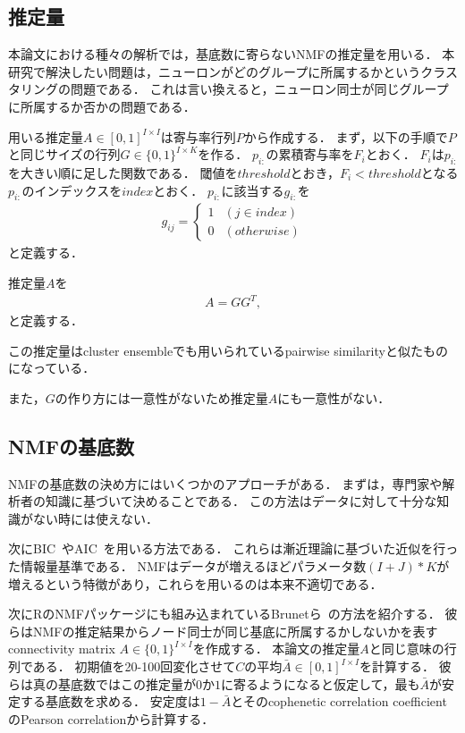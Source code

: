 \subsection{推定量}
本論文における種々の解析では，基底数に寄らないNMFの推定量を用いる．
本研究で解決したい問題は，ニューロンがどのグループに所属するかというクラスタリングの問題である．
これは言い換えると，ニューロン同士が同じグループに所属するか否かの問題である．

用いる推定量$A \in [0, 1]^{I \times I}$は寄与率行列$P$から作成する．
まず，以下の手順で$P$と同じサイズの行列$G \in \{0, 1\}^{I \times K}$を作る．
$p_{i:}$の累積寄与率を$F_i$とおく．
$F_i$は$p_{i:}$を大きい順に足した関数である．
閾値を$threshold$とおき，$F_i < threshold$となる$p_{i:}$のインデックスを$index$とおく．
$p_{i:}$に該当する$g_{i:}$を
\begin{eqnarray}
	g_{ij} = \begin{cases}
		1 & (j \in index) \\
		0 & (otherwise)
	\end{cases}
\end{eqnarray}
と定義する．

推定量$A$を
\begin{eqnarray}
	A = G G^T,
\end{eqnarray}
と定義する．

この推定量はcluster ensembleでも用いられているpairwise similarity\cite{Boongoen2018}と似たものになっている．

また，$G$の作り方には一意性がないため推定量$A$にも一意性がない．

\subsection{NMFの基底数}
NMFの基底数の決め方にはいくつかのアプローチがある．
まずは，専門家や解析者の知識に基づいて決めることである．
この方法はデータに対して十分な知識がない時には使えない．

次にBIC~\cite{wasserman2000a}やAIC~\cite{Akaike1974}を用いる方法である．
これらは漸近理論に基づいた近似を行った情報量基準である．
NMFはデータが増えるほどパラメータ数$(I + J) * K$が増えるという特徴があり，これらを用いるのは本来不適切である．

次にRのNMFパッケージにも組み込まれているBrunetら~\cite{Brunet2004}の方法を紹介する．
彼らはNMFの推定結果からノード同士が同じ基底に所属するかしないかを表すconnectivity matrix $A \in \{0, 1\}^{I \times I}$を作成する．
本論文の推定量$A$と同じ意味の行列である．
初期値を20-100回変化させて$C$の平均$\bar{A} \in [0, 1]^{I \times I}$を計算する．
彼らは真の基底数ではこの推定量が$0$か$1$に寄るようになると仮定して，最も$\bar{A}$が安定する基底数を求める．
安定度は$1- \bar{A}$とそのcophenetic correlation coefficientのPearson correlationから計算する．

